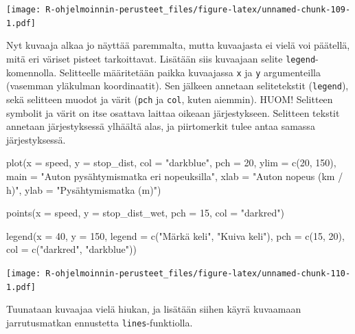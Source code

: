 \documentclass[
]{book}
\newenvironment{Shaded}{\begin{snugshade}}{\end{snugshade}}
\newcommand{\AttributeTok}[1]{\textcolor[rgb]{0.77,0.63,0.00}{#1}}
\newcommand{\DecValTok}[1]{\textcolor[rgb]{0.00,0.00,0.81}{#1}}
\newcommand{\FunctionTok}[1]{\textcolor[rgb]{0.00,0.00,0.00}{#1}}
\newcommand{\NormalTok}[1]{#1}
\newcommand{\StringTok}[1]{\textcolor[rgb]{0.31,0.60,0.02}{#1}}
\begin{document}
\texttt{[image: R-ohjelmoinnin-perusteet\_files/figure-latex/unnamed-chunk-109-1.pdf]}

Nyt kuvaaja alkaa jo näyttää paremmalta, mutta kuvaajasta ei vielä voi päätellä, mitä eri väriset pisteet tarkoittavat. Lisätään siis kuvaajaan selite \texttt{legend}-komennolla. Selitteelle määritetään paikka kuvaajassa \texttt{x} ja \texttt{y} argumenteilla (vasemman yläkulman koordinaatit). Sen jälkeen annetaan selitetekstit (\texttt{legend}), sekä selitteen muodot ja värit (\texttt{pch} ja \texttt{col}, kuten aiemmin). HUOM! Selitteen symbolit ja värit on itse osattava laittaa oikeaan järjestykseen. Selitteen tekstit annetaan järjestyksessä ylhäältä alas, ja piirtomerkit tulee antaa samassa järjestyksessä.

\begin{Shaded}
\begin{Highlighting}[]
\FunctionTok{plot}\NormalTok{(}\AttributeTok{x =}\NormalTok{ speed, }\AttributeTok{y =}\NormalTok{ stop\_dist,}
     \AttributeTok{col =} \StringTok{"darkblue"}\NormalTok{, }\AttributeTok{pch =} \DecValTok{20}\NormalTok{,}
     \AttributeTok{ylim =} \FunctionTok{c}\NormalTok{(}\DecValTok{20}\NormalTok{, }\DecValTok{150}\NormalTok{),}
     \AttributeTok{main =} \StringTok{"Auton pysähtymismatka eri nopeuksilla"}\NormalTok{,}
     \AttributeTok{xlab =} \StringTok{"Auton nopeus (km / h)"}\NormalTok{, }\AttributeTok{ylab =} \StringTok{"Pysähtymismatka (m)"}\NormalTok{)}

\FunctionTok{points}\NormalTok{(}\AttributeTok{x =}\NormalTok{ speed, }\AttributeTok{y =}\NormalTok{ stop\_dist\_wet, }\AttributeTok{pch =} \DecValTok{15}\NormalTok{, }\AttributeTok{col =} \StringTok{"darkred"}\NormalTok{)}

\FunctionTok{legend}\NormalTok{(}\AttributeTok{x =} \DecValTok{40}\NormalTok{, }\AttributeTok{y =} \DecValTok{150}\NormalTok{,}
       \AttributeTok{legend =} \FunctionTok{c}\NormalTok{(}\StringTok{"Märkä keli"}\NormalTok{, }\StringTok{"Kuiva keli"}\NormalTok{),}
       \AttributeTok{pch =} \FunctionTok{c}\NormalTok{(}\DecValTok{15}\NormalTok{, }\DecValTok{20}\NormalTok{), }\AttributeTok{col =} \FunctionTok{c}\NormalTok{(}\StringTok{"darkred"}\NormalTok{, }\StringTok{"darkblue"}\NormalTok{))}
\end{Highlighting}
\end{Shaded}

\texttt{[image: R-ohjelmoinnin-perusteet\_files/figure-latex/unnamed-chunk-110-1.pdf]}

Tuunataan kuvaajaa vielä hiukan, ja lisätään siihen käyrä kuvaamaan jarrutusmatkan ennustetta \texttt{lines}-funktiolla.
\end{document}
